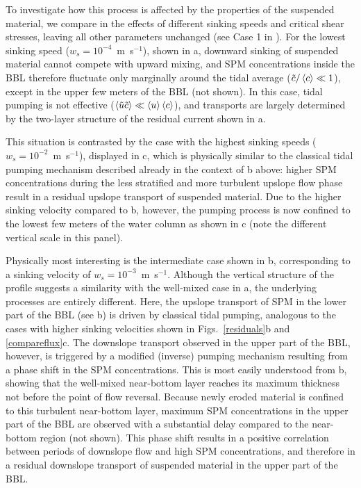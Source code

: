 To investigate how this process is affected by the properties of the
suspended material, we compare in  the effects of
different sinking speeds and critical shear stresses, leaving all
other parameters unchanged (see Case 1 in ). For the
lowest sinking speed ($w_s=10^{-4}$~m~s$^{-1}$), shown in
a, downward sinking of suspended material cannot
compete with upward mixing, and SPM concentrations inside the BBL
therefore fluctuate only marginally around the tidal average
($\tilde{c}/\left\langle c \right\rangle \ll 1$), except in the upper few meters of the
BBL (not shown). In this case, tidal pumping is not effective
($\left\langle \tilde{u}\tilde{c} \right\rangle \ll \left\langle u \right\rangle \left\langle c \right\rangle$), and transports
are largely determined by the two-layer structure of the residual
current shown in a.

This situation is contrasted by the case with the highest sinking
speeds ($w_s=10^{-2}$~m~s$^{-1}$), displayed in c,
which is physically similar to the classical tidal pumping mechanism
described already in the context of b above: higher SPM
concentrations during the less stratified and more turbulent upslope
flow phase result in a residual upslope transport of suspended
material. Due to the higher sinking velocity compared to
b, however, the pumping process is now confined to the
lowest few meters of the water column as shown in c
(note the different vertical scale in this panel).

Physically most interesting is the intermediate case shown in
b, corresponding to a sinking velocity of
$w_s=10^{-3}$~m~s$^{-1}$. Although the vertical structure of the
profile suggests a similarity with the well-mixed case in
a, the underlying processes are entirely
different. Here, the upslope transport of SPM in the lower part of the
BBL (see b) is driven by classical tidal pumping,
analogous to the cases with higher sinking velocities shown in
Figs.\ \ref{residuals}b and \ref{compareflux}c. The downslope
transport observed in the upper part of the BBL, however, is triggered
by a modified (inverse) pumping mechanism resulting from a phase shift
in the SPM concentrations. This is most easily understood from
b, showing that the well-mixed near-bottom layer
reaches its maximum thickness not before the point of flow
reversal. Because newly eroded material is confined to this turbulent
near-bottom layer, maximum SPM concentrations in the upper part of the
BBL are observed with a substantial delay compared to the near-bottom
region (not shown). This phase shift results in a positive correlation
between periods of downslope flow and high SPM concentrations, and
therefore in a residual downslope transport of suspended material in
the upper part of the BBL.

